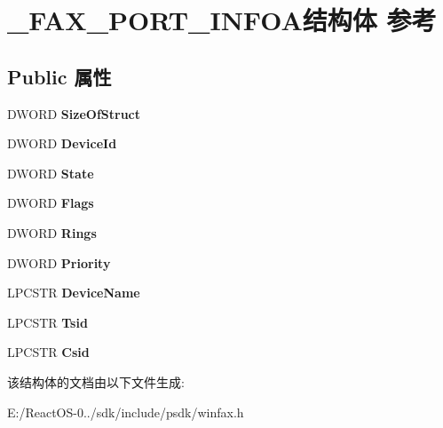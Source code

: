 \hypertarget{struct___f_a_x___p_o_r_t___i_n_f_o_a}{}\section{\+\_\+\+F\+A\+X\+\_\+\+P\+O\+R\+T\+\_\+\+I\+N\+F\+O\+A结构体 参考}
\label{struct___f_a_x___p_o_r_t___i_n_f_o_a}
\subsection*{Public 属性}
\begin{DoxyCompactItemize}
\item 
\mbox{\label{struct___f_a_x___p_o_r_t___i_n_f_o_a_ac360125760d976b5fe8e4d8c186e68e5}} 
D\+W\+O\+RD {\bfseries Size\+Of\+Struct}
\item 
\mbox{\label{struct___f_a_x___p_o_r_t___i_n_f_o_a_a6a075ba555b7a9f6ec2c1839e5cd4015}} 
D\+W\+O\+RD {\bfseries Device\+Id}
\item 
\mbox{\label{struct___f_a_x___p_o_r_t___i_n_f_o_a_a9d6913ef2110c3e02d6d57327e269ec6}} 
D\+W\+O\+RD {\bfseries State}
\item 
\mbox{\label{struct___f_a_x___p_o_r_t___i_n_f_o_a_af6bf3b5a7ec70793ae3817a39cbe8aa7}} 
D\+W\+O\+RD {\bfseries Flags}
\item 
\mbox{\label{struct___f_a_x___p_o_r_t___i_n_f_o_a_ababfe6759098cb714df5355d84038e77}} 
D\+W\+O\+RD {\bfseries Rings}
\item 
\mbox{\label{struct___f_a_x___p_o_r_t___i_n_f_o_a_a49c68202ffea63507b8cf0a942ef9d98}} 
D\+W\+O\+RD {\bfseries Priority}
\item 
\mbox{\label{struct___f_a_x___p_o_r_t___i_n_f_o_a_ac346c56c0fd9cea7e6beae101c758356}} 
L\+P\+C\+S\+TR {\bfseries Device\+Name}
\item 
\mbox{\label{struct___f_a_x___p_o_r_t___i_n_f_o_a_ac4073a3222523546567b35f21f027122}} 
L\+P\+C\+S\+TR {\bfseries Tsid}
\item 
\mbox{\label{struct___f_a_x___p_o_r_t___i_n_f_o_a_adcf866296c588c48153a0dee72f3f071}} 
L\+P\+C\+S\+TR {\bfseries Csid}
\end{DoxyCompactItemize}


该结构体的文档由以下文件生成\+:\begin{DoxyCompactItemize}
\item 
E\+:/\+React\+O\+S-\/0../sdk/include/psdk/winfax.\+h\end{DoxyCompactItemize}
